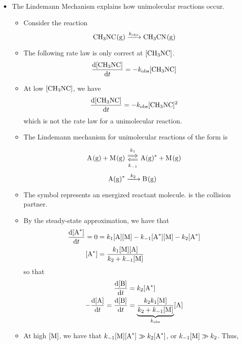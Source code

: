 \documentclass[../notes.tex]{subfiles}
\begin{document}
\begin{itemize}
\begin{itemize}
    \end{itemize}
    \item The Lindemann Mechanism explains how unimolecular reactions occur.
    \begin{itemize}
        \item Consider the reaction
        \begin{equation*}
            \ce{CH3NC(g) ->[$k_\text{obs}$] CH3CN(g)}
        \end{equation*}
        \item The following rate law is only correct at $[\ce{CH3NC}]$.
        \begin{equation*}
            \dv{[\ce{CH3NC}]}{t} = -k_\text{obs}[\ce{CH3NC}]
        \end{equation*}
        \item At low $[\ce{CH3NC}]$, we have
        \begin{equation*}
            \dv{[\ce{CH3NC}]}{t} = -k_\text{obs}[\ce{CH3NC}]^2
        \end{equation*}
        which is not the rate law for a unimolecular reaction.
        \item The Lindemann mechanism for unimolecular reactions of the form  is
        \begin{align*}
            \ce{A(g) + M(g)} &\Longleftrightarrows[k_1][k_{-1}] \ce{A(g)^* + M(g)}\\
            \ce{A(g)^*} &\ce{->[$k_2$]} \ce{B(g)}
        \end{align*}
        \item The symbol  represents an energized reactant molecule.  is the collision partner.
        \item By the steady-state approximation, we have that
        \begin{align*}
            \dv{[\ce{A^*}]}{t} = 0 &= k_1[\ce{A}][\ce{M}]-k_{-1}[\ce{A^*}][\ce{M}]-k_2[\ce{A^*}]\\
            [\ce{A^*}] &= \frac{k_1[\ce{M}][\ce{A}]}{k_2+k_{-1}[\ce{M}]}
        \end{align*}
        so that
        \begin{align*}
            \dv{[\ce{B}]}{t} &= k_2[\ce{A^*}]\\
            -\dv{[\ce{A}]}{t} = \dv{[\ce{B}]}{t} &= \underbrace{\frac{k_2k_1[\ce{M}]}{k_2+k_{-1}[\ce{M}]}}_{k_\text{obs}}[\ce{A}]
        \end{align*}
        \item At high $[\ce{M}]$, we have that $k_{-1}[\ce{M}][\ce{A^*}]\gg k_2[\ce{A^*}]$, or $k_{-1}[\ce{M}]\gg k_2$. Thus,

\end{itemize}
\end{itemize}
\end{document}
